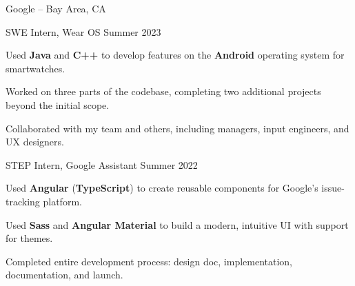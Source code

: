 \begin{entry}{Google -- Bay Area, CA}

	\entryItem
		{SWE Intern, Wear OS}
		{Summer 2023}
	
		\begin{items}
			\item Used \textbf{Java} and \textbf{C++} to develop features on the \textbf{Android} operating system for smartwatches.
			\item Worked on three parts of the codebase, completing two additional projects beyond the initial scope.
			\item Collaborated with my team and others, including managers, input engineers, and UX designers.
		\end{items}

	\entryItem
		{STEP Intern, Google Assistant}
		{Summer 2022}

		\begin{items}
			\item Used \textbf{Angular} (\textbf{TypeScript}) to create reusable components for Google's issue-tracking platform.
			\item Used \textbf{Sass} and \textbf{Angular Material} to build a modern, intuitive UI with support for themes.
			\item Completed entire development process: design doc, implementation, documentation, and launch.
		\end{items}

\end{entry}

